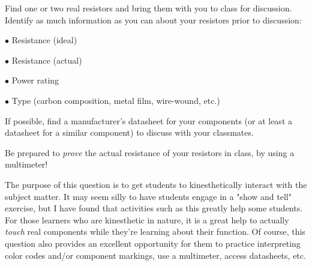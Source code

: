 

Find one or two real resistors and bring them with you to class for discussion.  Identify as much information as you can about your resistors prior to discussion:

\medskip
\item{$\bullet$} Resistance (ideal)
\item{$\bullet$} Resistance (actual)
\item{$\bullet$} Power rating
\item{$\bullet$} Type (carbon composition, metal film, wire-wound, etc.)
\medskip







If possible, find a manufacturer's datasheet for your components (or at least a datasheet for a similar component) to discuss with your classmates.

Be prepared to {\it prove} the actual resistance of your resistors in class, by using a multimeter!







The purpose of this question is to get students to kinesthetically interact with the subject matter.  It may seem silly to have students engage in a "show and tell" exercise, but I have found that activities such as this greatly help some students.  For those learners who are kinesthetic in nature, it is a great help to actually {\it touch} real components while they're learning about their function.  Of course, this question also provides an excellent opportunity for them to practice interpreting color codes and/or component markings, use a multimeter, access datasheets, etc.




